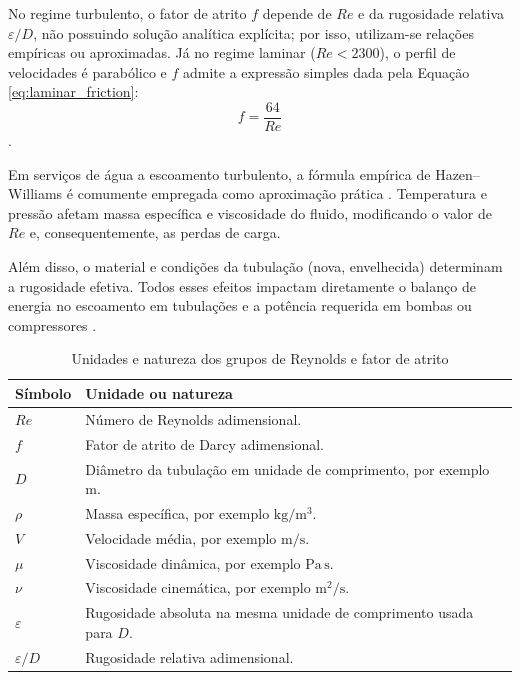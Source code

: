 No regime turbulento, o fator de atrito $f$ depende de $Re$ e da rugosidade relativa $\varepsilon/D$, não possuindo solução analítica explícita; por isso, utilizam-se relações empíricas ou aproximadas. Já no regime laminar ($Re < 2300$), o perfil de velocidades é parabólico e $f$ admite a expressão simples dada pela Equação \ref{eq:laminar_friction}:
\begin{equation}
f = \frac{64}{Re}
\label{eq:laminar_friction}
\end{equation}.

Em serviços de água a escoamento turbulento, a fórmula empírica de Hazen--Williams é comumente empregada como aproximação prática \cite{perry2007}. Temperatura e pressão afetam massa específica e viscosidade do fluido, modificando o valor de $Re$ e, consequentemente, as perdas de carga.

Além disso, o material e condições da tubulação (nova, envelhecida) determinam a rugosidade efetiva. Todos esses efeitos impactam diretamente o balanço de energia no escoamento em tubulações e a potência requerida em bombas ou compressores \cite{perry2007,white2018}.

\begin{table}[H]
    \centering
    \caption{Unidades e natureza dos grupos de Reynolds e fator de atrito}
    \label{tab:unidades-reynolds-atrito}
    \begin{tabular}{|p{}|p{}|}
        \hline
        \textbf{Símbolo} & \textbf{Unidade ou natureza} \\ \hline
        $Re$ & Número de Reynolds adimensional. \\ \hline
        $f$ & Fator de atrito de Darcy adimensional. \\ \hline
        $D$ & Diâmetro da tubulação em unidade de comprimento, por exemplo $\mathrm{m}$. \\ \hline
        $\rho$ & Massa específica, por exemplo $\mathrm{kg/m^3}$. \\ \hline
        $V$ & Velocidade média, por exemplo $\mathrm{m/s}$. \\ \hline
        $\mu$ & Viscosidade dinâmica, por exemplo $\mathrm{Pa\,s}$. \\ \hline
        $\nu$ & Viscosidade cinemática, por exemplo $\mathrm{m^2/s}$. \\ \hline
        $\varepsilon$ & Rugosidade absoluta na mesma unidade de comprimento usada para $D$. \\ \hline
        $\varepsilon/D$ & Rugosidade relativa adimensional. \\ \hline
    \end{tabular}
\end{table}

